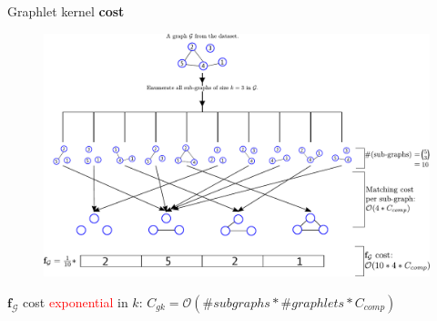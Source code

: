 \documentclass{beamer}
\begin{document}
\begin{frame}{Graphlet kernel \textbf{cost}}
	\footnotesize
	\begin{figure}[H]
		\centering
		\includegraphics[scale=0.45]{figs/gk_cost.pdf}
		\vfill
	\end{figure}
	$\mathbf{f}_\mathcal{G}$ cost \textcolor{red}{exponential}  in $k$: $C_{gk}=\mathcal{O}(\#subgraphs*\#graphlets*C_{comp})$
\end{frame}

\end{document}
